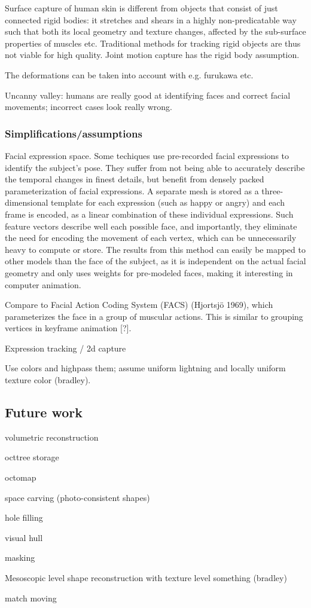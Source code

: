 Surface capture of human skin is different from objects that consist of just connected rigid bodies: it stretches and shears in a highly non-predicatable way such that both its local geometry and texture changes, affected by the sub-surface properties of muscles etc.
Traditional methods for tracking rigid objects are thus not viable for high quality.
Joint motion capture has the rigid body assumption.

The deformations can be taken into account with e.g. furukawa etc.

Uncanny valley: humans are really good at identifying faces and correct facial movements; incorrect cases look really wrong.

\subsubsection{Simplifications/assumptions}

Facial expression space. Some techiques \cite{faceshift,something} use pre-recorded facial expressions to identify the subject's pose.
They suffer from not being able to accurately describe the temporal changes in finest details, but benefit from densely packed parameterization of facial expressions.
A separate mesh is stored as a three-dimensional template for each expression (such as happy or angry) and each frame is encoded, as a linear combination of these individual expressions.
Such feature vectors describe well each possible face, and importantly, they eliminate the need for encoding the movement of each vertex, which can be unnecessarily heavy to compute or store.
The results from this method can easily be mapped to other models than the face of the subject, as it is independent on the actual facial geometry and only uses weights for pre-modeled faces, making it interesting in computer animation.

Compare to Facial Action Coding System (FACS) (Hjortsjö 1969), which parameterizes the face in a group of muscular actions. This is similar to grouping vertices in keyframe animation [?].

Expression tracking / 2d capture

Use colors and highpass them; assume uniform lightning and locally uniform texture color (bradley).

\subsection{Future work}

volumetric reconstruction

octtree storage

octomap

space carving (photo-consistent shapes)

hole filling

visual hull

masking

Mesoscopic level shape reconstruction with texture level something (bradley)

match moving
